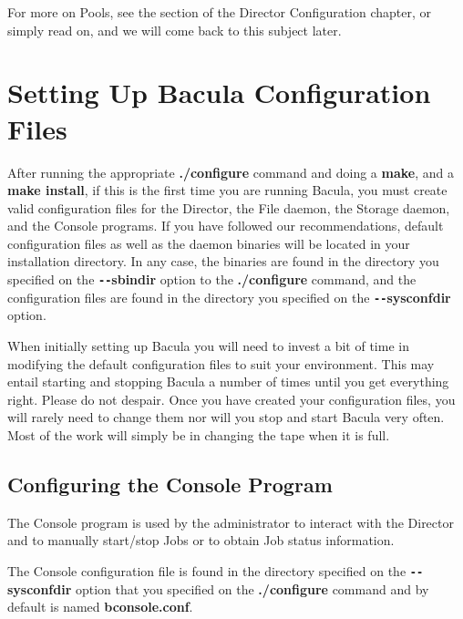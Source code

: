 For more on Pools, see the 
 section of the Director
Configuration chapter, or simply read on, and we will come back to this
subject later. 

\section{Setting Up Bacula Configuration Files}
\label{config}

After running the appropriate {\bf ./configure} command and doing
a {\bf make}, and a {\bf make install}, if this is the first time
you are running Bacula, you must create valid configuration files
for the Director, the File daemon, the Storage daemon, and the
Console programs.  If you have followed our recommendations,
default configuration files as well as the daemon binaries will
be located in your installation directory.  In any case, the
binaries are found in the directory you specified on the {\bf
\verb:--:sbindir} option to the {\bf ./configure} command, and
the configuration files are found in the directory you specified
on the {\bf \verb:--:sysconfdir} option.

When initially setting up Bacula you will need to invest a bit of time in
modifying the default configuration files to suit your environment. This may
entail starting and stopping Bacula a number of times until you get everything
right. Please do not despair. Once you have created your configuration files,
you will rarely need to change them nor will you stop and start Bacula very
often. Most of the work will simply be in changing the tape when it is full. 

\subsection{Configuring the Console Program}

The Console program is used by the administrator to interact with the Director
and to manually start/stop Jobs or to obtain Job status information. 

The Console configuration file is found in the directory specified on the
{\bf \verb:--:sysconfdir} option that you specified on the {\bf
./configure} command and by default is named {\bf bconsole.conf}.

